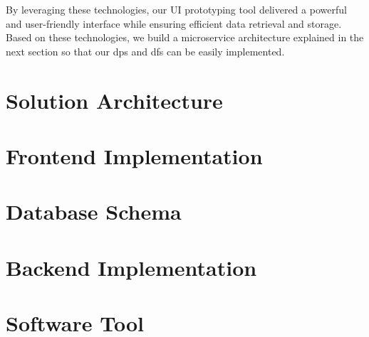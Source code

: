 By leveraging these technologies, our UI prototyping tool delivered a powerful and user-friendly interface while ensuring efficient data retrieval and storage.
Based on these technologies, we build a microservice architecture explained in the next section so that our \ac{dp}s and \ac{df}s can be easily implemented. 
\clearpage

\section{Solution Architecture}
\label{implementation:section:architecture}

\section{Frontend Implementation}
\label{implementation:section:frontend}

\section{Database Schema}
\label{implementation:section:database}

\section{Backend Implementation}
\label{implementation:section:backend}

\section{Software Tool}
\label{implementation:section:tool}